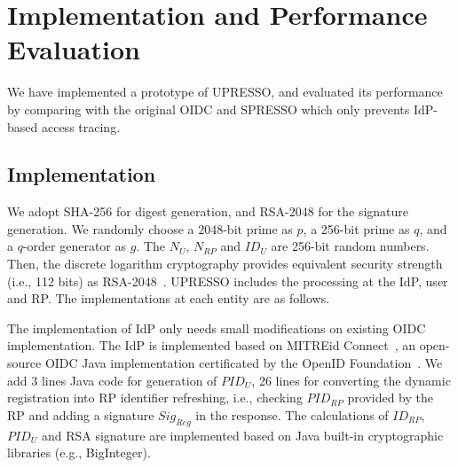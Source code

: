 \section{Implementation and Performance Evaluation}
\label{sec:implementation}
We have implemented a prototype of UPRESSO, and evaluated its performance by comparing with the original OIDC and SPRESSO which only prevents IdP-based access tracing.

\subsection{Implementation}
We adopt SHA-256 for digest generation, and  RSA-2048 for the signature generation. %
We randomly choose a 2048-bit prime as $p$, a 256-bit prime as $q$, and a  $q$-order generator as $g$. The  $N_U$, $N_{RP}$ and $ID_U$  are 256-bit random numbers. Then, the discrete logarithm cryptography  provides equivalent security strength (i.e., 112 bits) as RSA-2048~\cite{barkerecommendation}.
UPRESSO includes the processing at the IdP, user and RP. The implementations at each entity are as follows.

The implementation of IdP only needs small modifications on existing OIDC implementation. The IdP is implemented based on MITREid Connect~\cite{MITREid}, an open-source OIDC Java implementation certificated by the OpenID Foundation~\cite{OIDF}.
We add 3 lines Java code for generation of $PID_U$, 26 lines for converting the dynamic registration into RP identifier refreshing, i.e., checking $PID_{RP}$ provided by the RP and adding a signature $Sig_{Reg}$ in the response.  %
The calculations of $ID_{RP}$, $PID_U$ and RSA signature are implemented based on Java built-in cryptographic libraries (e.g., BigInteger).


